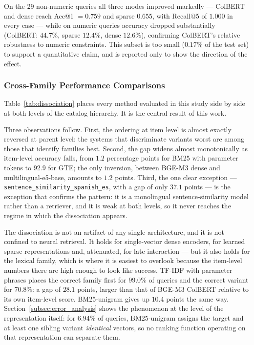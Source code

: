 \documentclass[preprint,review,12pt]{elsarticle}
\begin{document}
On the 29 non-numeric queries all three modes improved markedly --- ColBERT and dense reach Acc@1 $=0.759$ and sparse $0.655$, with Recall@5 of $1.000$ in every case --- while on numeric queries accuracy dropped substantially (ColBERT: $44.7\%$, sparse $12.4\%$, dense $12.6\%$), confirming ColBERT's relative robustness to numeric constraints. This subset is too small ($0.17\%$ of the test set) to support a quantitative claim, and is reported only to show the direction of the effect.

\subsubsection{Cross-Family Performance Comparisons}
\label{subsec:cross_family}

Table~\ref{tab:dissociation} places every method evaluated in this study side by side at both levels of the catalog hierarchy. It is the central result of this work.



Three observations follow. First, the ordering at item level is almost exactly reversed at parent level: the systems that discriminate variants worst are among those that identify families best. Second, the gap widens almost monotonically as item-level accuracy falls, from $1.2$ percentage points for BM25 with parameter tokens to $92.9$ for GTE; the only inversion, between BGE-M3 dense and multilingual-e5-base, amounts to $1.2$ points. Third, the one clear exception --- \texttt{sentence\_similarity\_spanish\_es}, with a gap of only $37.1$ points --- is the exception that confirms the pattern: it is a monolingual sentence-similarity model rather than a retriever, and it is weak at both levels, so it never reaches the regime in which the dissociation appears.

The dissociation is not an artifact of any single architecture, and it is not confined to neural retrieval. It holds for single-vector dense encoders, for learned sparse representations and, attenuated, for late interaction --- but it also holds for the lexical family, which is where it is easiest to overlook because the item-level numbers there are high enough to look like success. TF-IDF with parameter phrases places the correct family first for $99.0\%$ of queries and the correct variant for $70.8\%$: a gap of $28.1$ points, larger than that of BGE-M3 ColBERT relative to its own item-level score. BM25-unigram gives up $10.4$ points the same way. Section~\ref{subsec:error_analysis} shows the phenomenon at the level of the representation itself: for $6.94\%$ of queries, BM25-unigram assigns the target and at least one sibling variant \emph{identical} vectors, so no ranking function operating on that representation can separate them.
\end{document}
